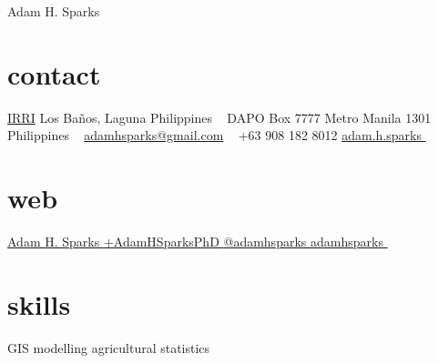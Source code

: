 
\hfill {\Huge Adam H. Sparks}

\begin{aside}
\small{\section{contact}
\href{http://www.irri.org/}{IRRI}
Los Ba\~nos, Laguna
Philippines
~
DAPO Box 7777
Metro Manila
1301 Philippines
~
\href{mailto:adamhsparks@gmail.com}{adamhsparks@gmail.com}
~
+63 908 182 8012  \faMobilePhone
{\href{skype:adam.h.sparks?call}{adam.h.sparks }}
~
\section{web}
\href{https://ph.linkedin.com/pub/adam-sparks/8b/b96/507}{Adam H. Sparks {\color{linkedin}\FA {}}}
\href{https://plus.google.com/+AdamHSparksPhD}{+AdamHSparksPhD {\color{google.plus}\FA {}}}
\href{https://www.twitter.com/adamhsparks/}{@adamhsparks {\color{twitter.blue}\FA {}}}
\href{https://github.com/adamhsparks/}{adamhsparks \FA {}}
~
\section{skills}
GIS
modelling
agricultural statistics}
\end{aside}

